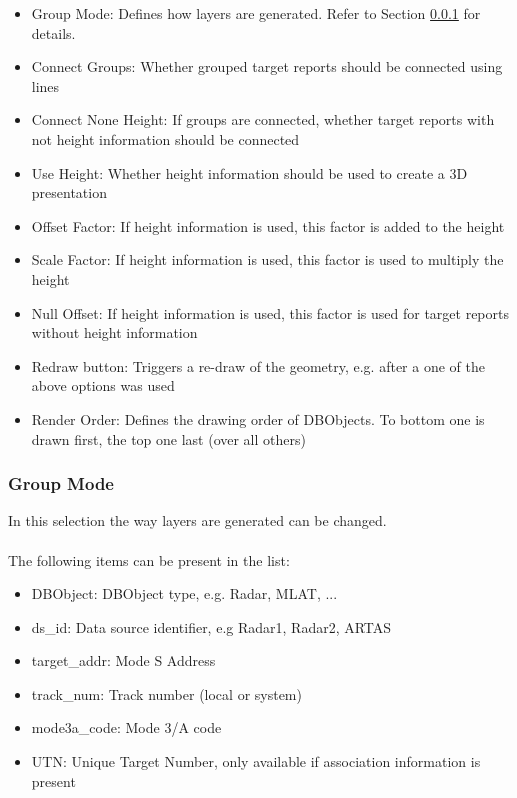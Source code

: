 \begin{itemize}
 \item Group Mode: Defines how layers are generated. Refer to Section \ref{sec:group_mode} for details.
 \item Connect Groups: Whether grouped target reports should be connected using lines
 \item Connect None Height: If groups are connected, whether target reports with not height information should be connected
 \item Use Height: Whether height information should be used to create a 3D presentation
 \item Offset Factor: If height information is used, this factor is added to the height
 \item Scale Factor: If height information is used, this factor is used to multiply the height
 \item Null Offset: If height information is used, this factor is used for target reports without height information
 \item Redraw button: Triggers a re-draw of the geometry, e.g. after a one of the above options was used
 \item Render Order: Defines the drawing order of DBObjects. To bottom one is drawn first, the top one last (over all others)
\end{itemize} 

\subsubsection{Group Mode}
\label{sec:group_mode}

In this selection the way layers are generated can be changed. \\\\

The following items can be present in the list:

\begin{itemize}
 \item DBObject: DBObject type, e.g. Radar, MLAT, ...
 \item ds\_id: Data source identifier, e.g Radar1, Radar2, ARTAS
 \item target\_addr: Mode S Address
 \item track\_num: Track number (local or system)
 \item mode3a\_code: Mode 3/A code
 \item UTN: Unique Target Number, only available if association information is present
\end{itemize}
\ \\

